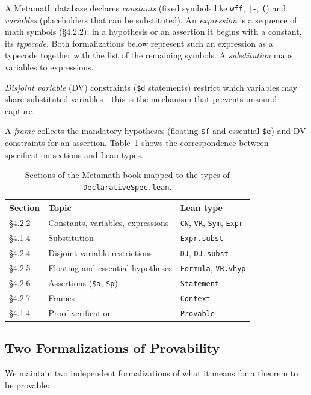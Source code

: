 \documentclass[11pt]{article}
\newcommand{\lean}[1]{\lstinline[language=Lean4]{#1}}
\newcommand{\file}[1]{\texttt{#1}}
\begin{document}
A Metamath database declares \emph{constants} (fixed symbols like
\texttt{wff}, \texttt{|-}, \texttt{(}) and \emph{variables} (placeholders
that can be substituted).  An \emph{expression} is a sequence of math
symbols (\S4.2.2); in a hypothesis or an assertion it begins with a
constant, its \emph{typecode}.  Both formalizations below represent such
an expression as a typecode together with the list of the remaining
symbols.  A \emph{substitution} maps variables to expressions.

\emph{Disjoint variable} (DV) constraints (\texttt{\$d} statements)
restrict which variables may share substituted variables---this is the
mechanism that prevents unsound capture.

A \emph{frame} collects the mandatory hypotheses (floating \texttt{\$f}
and essential \texttt{\$e}) and DV constraints for an assertion.
Table~\ref{tab:spec-mapping} shows the correspondence between
specification sections and Lean types.

\begin{table}[ht]
\centering
\caption{Sections of the Metamath book mapped to the types of \file{DeclarativeSpec.lean}.}
\label{tab:spec-mapping}
\begin{tabular}{lll}
\toprule
\textbf{Section} & \textbf{Topic} & \textbf{Lean type} \\
\midrule
\S4.2.2 & Constants, variables, expressions & \lean{CN}, \lean{VR}, \lean{Sym}, \lean{Expr} \\
\S4.1.4 & Substitution & \lean{Expr.subst} \\
\S4.2.4 & Disjoint variable restrictions & \lean{DJ}, \lean{DJ.subst} \\
\S4.2.5 & Floating and essential hypotheses & \lean{Formula}, \lean{VR.vhyp} \\
\S4.2.6 & Assertions (\texttt{\$a}, \texttt{\$p}) & \lean{Statement} \\
\S4.2.7 & Frames & \lean{Context} \\
\S4.1.4 & Proof verification & \lean{Provable} \\
\bottomrule
\end{tabular}
\end{table}

\subsection{Two Formalizations of Provability}

We maintain two independent formalizations of what it means for a theorem
to be provable:
\end{document}
